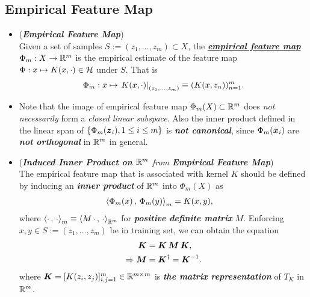 \documentclass[11pt]{article}
\begin{document}
\subsection{Empirical Feature Map}
\begin{itemize}
\item \begin{definition} (\emph{\textbf{Empirical Feature Map}}) \citep{scholkopf2001learning} \\
Given a set of samples $S:= (z_{1},\ldots, z_{m}) \subset X$, the \underline{\emph{\textbf{empirical feature map}}} $\Phi_{m}: X  \rightarrow {\mathbb R}^{m}$ is the empirical estimate of the feature map $\Phi: x \mapsto K(x, \cdot)\in {\mathcal H}$ under $S$.  That is 
\begin{align*}
\Phi_{m}: x \mapsto \left.{K( x, \cdot)}\right\vert_{(z_{1},\ldots, z_{m})} \equiv (K(x, z_{n}) )_{n=1}^{m}.
\end{align*}
\end{definition}

\item \begin{remark} 
Note that the image of empirical feature map $\Phi_{m}(X) \subset {\mathbb R}^{m}$ does \emph{not necessarily} form a \emph{closed linear subspace}. Also the inner product defined in the linear span of $\left\{\Phi_{m}(\boldsymbol{z}_{i}), 1\le i \le m\right\}$ is \emph{\textbf{not canonical}}, since $ \Phi_{m}(\boldsymbol{x}_{i})$ are \emph{\textbf{not orthogonal}} in ${\mathbb R}^{m}$ in general. 
\end{remark}

\item \begin{remark} (\emph{\textbf{Induced Inner Product on ${\mathbb R}^{m}$} from \textbf{Empirical Feature Map}})\\
The empirical feature map that is associated with kernel $K$ should be defined by inducing an \emph{\textbf{inner product}} of ${\mathbb R}^{m}$ into $\Phi_{m}(X)$ as
\begin{align*}
\left\langle \Phi_{m}(x)\,,\, \Phi_{m}(y) \right\rangle_{m} &= K(x, y),
\end{align*} 
where $\left\langle \cdot\,,\, \cdot \right\rangle_{m}\equiv \left\langle M\,\cdot\,,\, \cdot \right\rangle_{{\mathbb R}^{m}}$ for \emph{\textbf{positive definite matrix}} $M$. Enforcing $x, y \in S:= (z_{1},\ldots,z_{m})$ be in training set, we can obtain the equation
\begin{align*}
\boldsymbol{K} &= \boldsymbol{K\,M\,K},\\
\Rightarrow \boldsymbol{M} &= \boldsymbol{K}^{\dagger} = \boldsymbol{K}^{-1}.
\end{align*} where $\boldsymbol{K} = [K(z_i, z_j)]_{i,j=1}^{m} \in {\mathbb R}^{m \times m}$ is \emph{\textbf{the matrix representation}} of $T_K$ in ${\mathbb R}^{m}$.
\end{remark}


\end{itemize}
\end{document}
